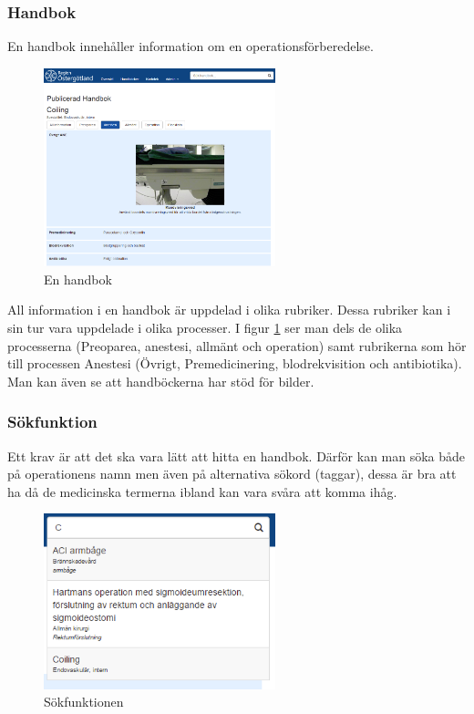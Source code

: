 \subsubsection{Handbok}
En handbok innehåller information om en operationsförberedelse.

\begin{figure}
  \centering
  \includegraphics[width=0.6\textwidth]{images/site/handbok.png}
  \caption{En handbok}
  \label{fig:handbok}
\end{figure}

All information i en handbok är uppdelad i olika rubriker. Dessa rubriker kan i sin tur vara uppdelade i olika processer.
I figur \ref{fig:handbok} ser man dels de olika processerna (Preoparea, anestesi, allmänt och operation) samt rubrikerna som hör till processen Anestesi (Övrigt, Premedicinering, blodrekvisition och  antibiotika).
Man kan även se att handböckerna har stöd för bilder.

\subsubsection{Sökfunktion}
Ett krav är att det ska vara lätt att hitta en handbok.
Därför kan man söka både på operationens namn men även på alternativa sökord (taggar), dessa är bra att ha då de medicinska termerna ibland kan vara svåra att komma ihåg.

\begin{figure}
  \centering
  \includegraphics[width=0.6\textwidth]{images/site/search}
  \caption{Sökfunktionen}
  \label{fig:search}
\end{figure}

